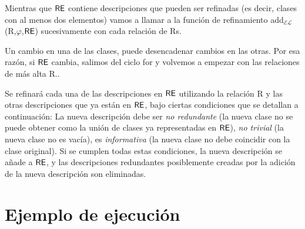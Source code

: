 Mientras que $\textsf{RE}$ contiene descripciones que pueden ser refinadas (es decir, clases
con al menos dos elementos) vamos a llamar a la funci\'on de refinamiento
add$_\mathcal{EL}$(R,$\varphi$,$\textsf{RE}$) sucesivamente con cada relaci\'on
de Rs.

 Un cambio en una de las clases, puede desencadenar cambios en
las otras. Por esa raz\'on, si $\textsf{RE}$ cambia, salimos del ciclo for y volvemos a
empezar con las relaciones de m\'as alta R.\puse. 

Se refinar\'a cada una de las descripciones
en $\textsf{RE}$ utilizando la relaci\'on R y las otras descripciones que ya est\'an en
$\textsf{RE}$, bajo ciertas condiciones que se detallan a continuaci\'on: 
La nueva descripci\'on debe ser
\emph{no redundante} (la nueva clase no se puede obtener como la uni\'on de
clases ya representadas en $\textsf{RE}$), \emph{no trivial} (la nueva
clase no es vac\'{i}a), es \emph{informativa} (la nueva clase no debe
coincidir con la clase original). Si se cumplen todas estas condiciones,
la nueva descripci\'on se a\~nade a $\textsf{RE}$, y las descripciones redundantes
posiblemente creadas por la adici\'on de la nueva descripci\'on son
eliminadas.

\section{Ejemplo de ejecuci\'on}
\label{sec:ejemplo_ejecucion}


